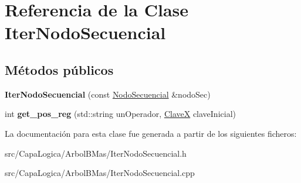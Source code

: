 \hypertarget{class_iter_nodo_secuencial}{\section{\-Referencia de la \-Clase \-Iter\-Nodo\-Secuencial}
\label{class_iter_nodo_secuencial}
}
\subsection*{\-Métodos públicos}
\begin{DoxyCompactItemize}
\item 
\hypertarget{class_iter_nodo_secuencial_a9a47304954276b5a16bdee6db7b505d3}{{\bfseries \-Iter\-Nodo\-Secuencial} (const \hyperlink{class_nodo_secuencial}{\-Nodo\-Secuencial} \&nodo\-Sec)}\label{class_iter_nodo_secuencial_a9a47304954276b5a16bdee6db7b505d3}

\item 
\hypertarget{class_iter_nodo_secuencial_a2db3b4883dc04b9ffbc4e31cf41ea320}{int {\bfseries get\-\_\-pos\-\_\-reg} (std\-::string un\-Operador, \hyperlink{class_clave_x}{\-Clave\-X} clave\-Inicial)}\label{class_iter_nodo_secuencial_a2db3b4883dc04b9ffbc4e31cf41ea320}

\end{DoxyCompactItemize}


\-La documentación para esta clase fue generada a partir de los siguientes ficheros\-:\begin{DoxyCompactItemize}
\item 
src/\-Capa\-Logica/\-Arbol\-B\-Mas/\-Iter\-Nodo\-Secuencial.\-h\item 
src/\-Capa\-Logica/\-Arbol\-B\-Mas/\-Iter\-Nodo\-Secuencial.\-cpp\end{DoxyCompactItemize}
